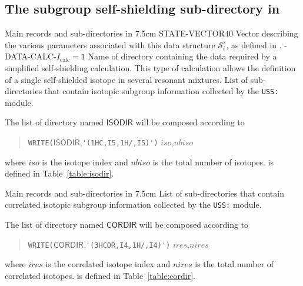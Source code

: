 \subsection{The subgroup self-shielding sub-directory  in
}\label{sect:subgroupdirselfshield}

\begin{DescriptionEnregistrement}{Main records and sub-directories in }{7.5cm}
\IntEnr
  {STATE-VECTOR}{$40$}
  {Vector describing the various parameters associated with this data structure $\mathcal{S}^{s}_{i}$,
  as defined in .}
\OptDirEnr
  {-DATA-CALC-}{$I_{\mathrm{calc}} = 1$}
  {Name of directory containing the data required by a simplified self-shielding
  calculation. This type of calculation allows the definition of a single
  self-shielded isotope in several resonant mixtures.}
\DirVar
  {}
  {List of sub-directories that contain isotopic subgroup information collected by the {\tt USS:} module.}
\end{DescriptionEnregistrement}

The list of directory  named $\mathsf{ISODIR}$ will be composed according to
\begin{quote}
\verb|WRITE(|$\mathsf{ISODIR}$,\verb|'(1HC,I5,1H/,I5)')| $iso$,$nbiso$
\end{quote}
\noindent where $iso$ is the isotope index and $nbiso$ is the total number of isotopes.  is defined in Table~\ref{table:isodir}.

\begin{DescriptionEnregistrement}{Main records and sub-directories in }{7.5cm}\label{table:isodir}
\DirVar
  {}
  {List of sub-directories that contain correlated isotopic subgroup information collected by the {\tt USS:} module.}
\end{DescriptionEnregistrement}

The list of directory  named $\mathsf{CORDIR}$ will be composed according to
\begin{quote}
\verb|WRITE(|$\mathsf{CORDIR}$,\verb|'(3HCOR,I4,1H/,I4)')| $ires$,$nires$
\end{quote}
\noindent where $ires$ is the correlated isotope index and $nires$ is the total number of correlated isotopes.  is defined
in Table~\ref{table:cordir}.

